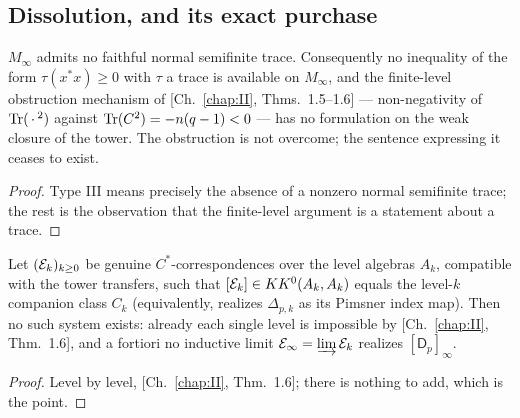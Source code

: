 \subsection{Dissolution, and its exact purchase}

\begin{corollary}\label{III:cor:dissolve}
$M_\infty$ admits no faithful normal semifinite trace. Consequently no inequality of
the form $\tau(x^*x)\ge0$ with $\tau$ a trace is available on $M_\infty$, and the
finite-level obstruction mechanism of [Ch.~\ref{chap:II}, Thms.~1.5--1.6] --- non-negativity of
$\operatorname{Tr}(\,\cdot\,^2)$ against $\operatorname{Tr}(C^2)=-n(q-1)<0$ --- has no formulation on the weak
closure of the tower. The obstruction is not overcome; the sentence expressing it
ceases to exist.
\end{corollary}

\begin{proof}
Type III means precisely the absence of a nonzero normal semifinite trace; the rest is
the observation that the finite-level argument is a statement about a trace.
\end{proof}

\begin{proposition}\label{III:prop:inductive}
Let $(\mathcal{E}_k)_{k\ge0}$ be genuine $C^*$-correspondences over the level algebras $A_k$,
compatible with the tower transfers, such that $[\mathcal{E}_k]\in KK^0(A_k,A_k)$ equals the
level-$k$ companion class $C_k$ (equivalently, realizes $\Delta_{p,k}$ as its Pimsner
index map). Then no such system exists: already each single level is impossible by
[Ch.~\ref{chap:II}, Thm.~1.6], and a fortiori no inductive limit
$\mathcal{E}_\infty=\varinjlim\mathcal{E}_k$ realizes $[\mathsf D_p]_\infty$.
\end{proposition}

\begin{proof}
Level by level, [Ch.~\ref{chap:II}, Thm.~1.6]; there is nothing to add, which is the point.
\end{proof}

